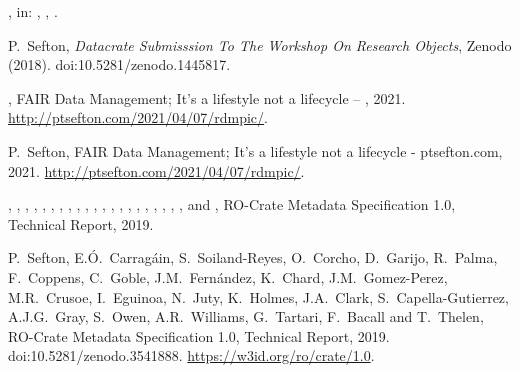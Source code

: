 \documentclass[ds,v1.1.2,openaccess]{iosart2x}%
\begin{document}
\begin{thebibliography}{}
%
\begin{bchapter}
,
in: ,
,
.
\end{bchapter}
%
\OrigBibText
P.~Sefton,
\textit{Datacrate Submisssion To The Workshop On Research Objects},
Zenodo
(2018).
doi:10.5281/zenodo.1445817.
\endOrigBibText
{}
\endbibitem

%
\begin{botherref}
,
{FAIR} Data Management; It's a lifestyle not a lifecycle -- ,
2021.
\url{http://ptsefton.com/2021/04/07/rdmpic/}.
\end{botherref}
%
\OrigBibText
P.~Sefton,
{FAIR} Data Management; It's a lifestyle not a lifecycle - ptsefton.com,
2021.
\url{http://ptsefton.com/2021/04/07/rdmpic/}.
\endOrigBibText
{}
\endbibitem

%
\begin{botherref}
,
,
,
,
,
,
,
,
,
,
,
,
,
,
,
,
,
,
,
,
,
 and
,
{RO}-Crate Metadata Specification 1.0,
Technical Report,
2019.
\end{botherref}
%
\OrigBibText
P.~Sefton,
E.{\'{O}}.~Carrag\'{a}in,
S.~Soiland-Reyes,
O.~Corcho,
D.~Garijo,
R.~Palma,
F.~Coppens,
C.~Goble,
J.M.~Fern\'{a}ndez,
K.~Chard,
J.M.~Gomez-Perez,
M.R.~Crusoe,
I.~Eguinoa,
N.~Juty,
K.~Holmes,
J.A.~Clark,
S.~Capella-Gutierrez,
A.J.G.~Gray,
S.~Owen,
A.R.~Williams,
G.~Tartari,
F.~Bacall and
T.~Thelen,
{RO}-Crate Metadata Specification 1.0,
Technical Report,
2019.
doi:10.5281/zenodo.3541888.
\url{https://w3id.org/ro/crate/1.0}.
\endOrigBibText
{}
\endbibitem


\end{thebibliography}
\end{document}
